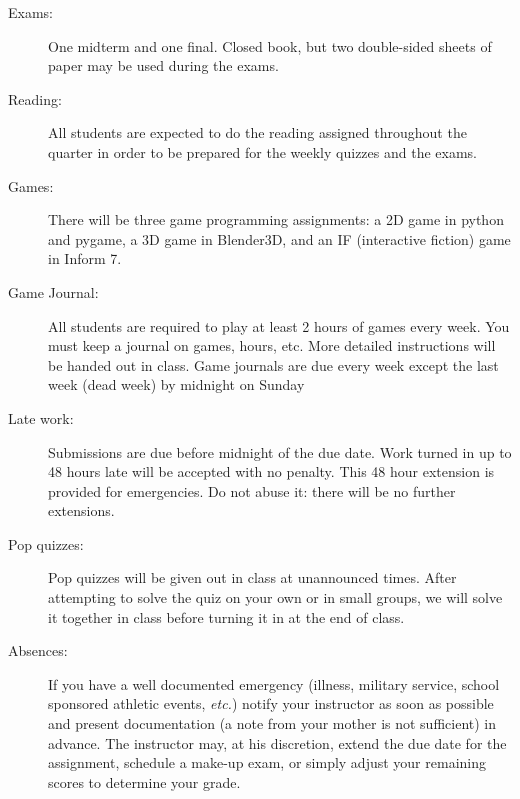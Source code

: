 \documentclass{article}
\begin{document}
\begin{description}
\item [Exams:] One midterm and one final.  Closed book, but two
  double-sided sheets of paper may be used during the exams.

\item [Reading:] All students are expected to do the 
  reading assigned throughout the quarter in order to be prepared for
  the weekly quizzes and the exams.

\item [Games:] There will be three game programming
  assignments:  a 2D game in python and pygame, a 3D game in Blender3D,
  and an IF (interactive fiction) game in Inform 7.

\item [Game Journal:] All students are required to play at least 2
  hours of games every week.  You must keep a journal on games, hours,
  etc.  More detailed instructions will be handed out in class. Game
  journals are due every week except the last week (dead week) by
  midnight on Sunday

\item[Late work:] Submissions are due before midnight of the due
date.  Work turned in up to 48 hours late will be accepted with no
penalty.  This 48 hour extension is provided for emergencies.  Do not
abuse it:  there will be no further extensions.

\item[Pop quizzes:]  Pop quizzes will be given out in class at
  unannounced times.  After attempting to solve the quiz on your own
  or in small groups, we will solve it together in class before
  turning it in at the end of class.

\item[Absences:] If you have a well documented emergency (illness,
  military service, school sponsored athletic events, {\em etc.})
  notify your instructor as soon as possible and present documentation
  (a note from your mother is not sufficient) in advance.  The
  instructor may, at his discretion, extend the due date for the
  assignment, schedule a make-up exam, or simply adjust your remaining
  scores to determine your grade.

\end{description}
\end{document}
